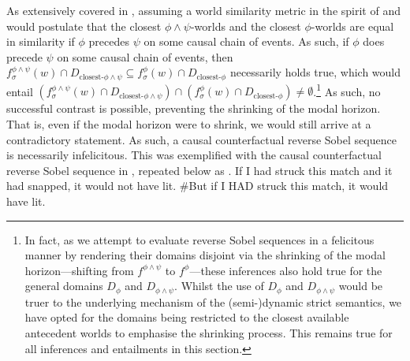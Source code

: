 As extensively covered in , assuming a world similarity metric in the spirit of \textcite{Bennett2003} and \textcite{Arregui2009} would postulate that the closest $\phi\land\psi$-worlds and the closest $\phi$-worlds are equal in similarity if $\phi$ precedes $\psi$ on some causal chain of events. As such, if $\phi$ does precede $\psi$ on some causal chain of events, then $f^{\phi\land\psi}_\sigma(w)\cap D_{\text{closest-}\phi\land\psi}\subseteq f^{\phi}_\sigma(w)\cap D_{\text{closest-}\phi}$ necessarily holds true, which would entail $(f^{\phi\land\psi}_\sigma(w)\cap D_{\text{closest-}\phi\land\psi})\cap(f^{\phi}_\sigma(w)\cap D_{\text{closest-}\phi})\neq\emptyset$.\footnote{In fact, as we attempt to evaluate reverse Sobel sequences in a felicitous manner by rendering their domains disjoint via the shrinking of the modal horizon---shifting from $f^{\phi\land\psi}$ to $f^{\phi}$---these inferences also hold true for the general domains $D_\phi$ and $D_{\phi\land\psi}$. Whilst the use of $D_\phi$ and $D_{\phi\land\psi}$ would be truer to the underlying mechanism of the (semi-)dynamic strict semantics, we have opted for the domains being restricted to the closest available antecedent worlds to emphasise the shrinking process. This remains true for all inferences and entailments in this section.} As such, no successful contrast is possible, preventing the shrinking of the modal horizon. That is, even if the modal horizon were to shrink, we would still arrive at a contradictory statement. As such, a causal counterfactual reverse Sobel sequence is necessarily infelicitous. This was exemplified with the causal counterfactual reverse Sobel sequence in , repeated below as .
\ex{}If I had struck this match and it had snapped, it would not have lit. \#But if I \MakeUppercase{had} struck this match, it would have lit.
\xe

